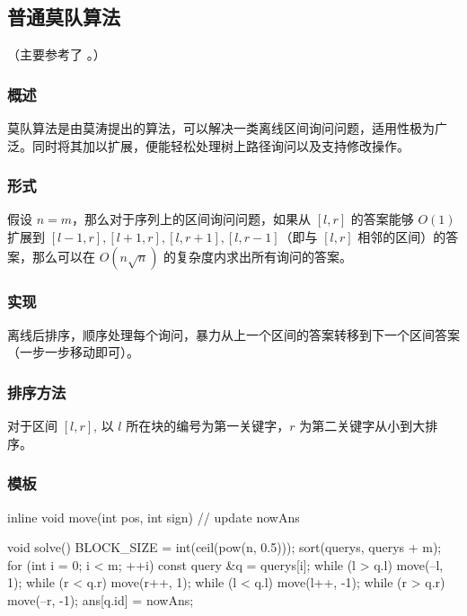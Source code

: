 
\subsection{普通莫队算法}

（主要参考了 \href{https://blog.sengxian.com/algorithms/mo-s-algorithm}{}。）

\subsubsection{概述}

莫队算法是由莫涛提出的算法，可以解决一类离线区间询问问题，适用性极为广泛。同时将其加以扩展，便能轻松处理树上路径询问以及支持修改操作。

\subsubsection{形式}

假设 $n=m$，那么对于序列上的区间询问问题，如果从 $[l,r]$ 的答案能够 $O(1)$ 扩展到 $[l-1,r],[l+1,r],[l,r+1],[l,r-1]$（即与 $[l,r]$ 相邻的区间）的答案，那么可以在 $O(n\sqrt{n})$ 的复杂度内求出所有询问的答案。

\subsubsection{实现}

离线后排序，顺序处理每个询问，暴力从上一个区间的答案转移到下一个区间答案（一步一步移动即可）。

\subsubsection{排序方法}

对于区间 $[l,r]$, 以 $l$ 所在块的编号为第一关键字，$r$ 为第二关键字从小到大排序。

\subsubsection{模板}

\begin{cppcode}
inline void move(int pos, int sign) {
  // update nowAns
}

void solve() {
  BLOCK_SIZE = int(ceil(pow(n, 0.5)));
  sort(querys, querys + m);
  for (int i = 0; i < m; ++i) {
    const query &q = querys[i];
    while (l > q.l) move(--l, 1);
    while (r < q.r) move(r++, 1);
    while (l < q.l) move(l++, -1);
    while (r > q.r) move(--r, -1);
    ans[q.id] = nowAns;
  }
}
\end{cppcode}

